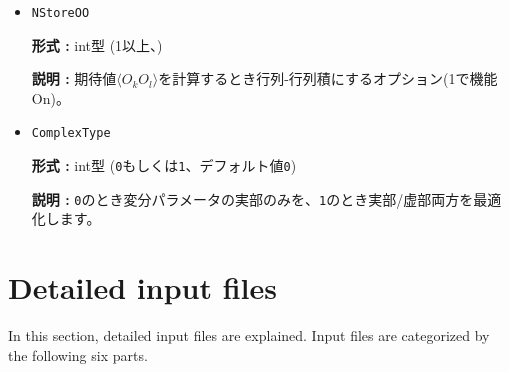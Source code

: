 \begin{itemize}
\item \verb|NStoreOO|

{\bf 形式 :} int型 (1以上、)

{\bf 説明 :} 期待値$\langle O_k O_l \rangle$を計算するとき行列-行列積にするオプション(1で機能On)。
 
\item  \verb|ComplexType|
  
  {\bf 形式 :} int型 (\verb|0|もしくは\verb|1|、デフォルト値\verb|0|)

  {\bf 説明 :} \verb|0|のとき変分パラメータの実部のみを、\verb|1|のとき実部/虚部両方を最適化します。

\end{itemize}


\newpage
\section{Detailed input files}
\label{Ch:HowToExpert}

In this section, detailed input files are explained. Input files are categorized by the following six parts.

